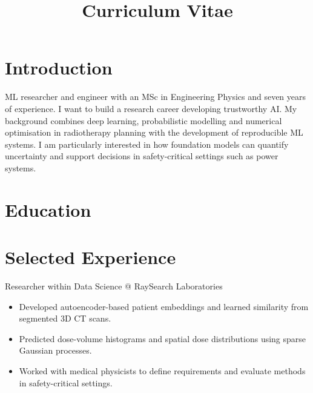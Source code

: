 \documentclass[11pt,a4paper]{moderncv}
\title{Curriculum Vitae}
\begin{document}
\makecvtitle

\section*{Introduction}
ML researcher and engineer with an MSc in Engineering Physics and seven years of experience. I want to build a research career developing trustworthy AI. My background combines deep learning, probabilistic modelling and numerical optimisation in radiotherapy planning with the development of reproducible ML systems. I am particularly interested in how foundation models can quantify uncertainty and support decisions in safety-critical settings such as power systems.

\section{Education}





\section{Selected Experience}

\large{Researcher within Data Science @ RaySearch Laboratories}
\normalsize
\begin{itemize}
    \item Developed autoencoder-based patient embeddings and learned similarity from segmented 3D CT scans.
    \item Predicted dose-volume histograms and spatial dose distributions using sparse Gaussian processes.
    \item Worked with medical physicists to define requirements and evaluate methods in safety-critical settings.
\end{itemize}
\end{document}
